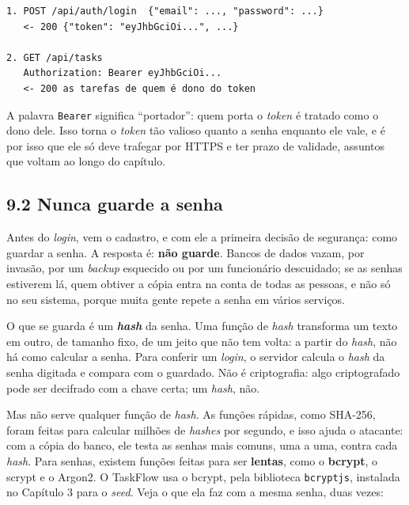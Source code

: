 \begin{codigo}
\begin{Verbatim}[breaklines=true, breaksymbolleft={}, fontsize=\footnotesize]
1. POST /api/auth/login  {"email": ..., "password": ...}
   <- 200 {"token": "eyJhbGciOi...", ...}

2. GET /api/tasks
   Authorization: Bearer eyJhbGciOi...
   <- 200 as tarefas de quem é dono do token
\end{Verbatim}
\end{codigo}

A palavra \texttt{Bearer} significa ``portador'': quem porta o \textit{token} é tratado como o dono dele. Isso torna o \textit{token} tão valioso quanto a senha enquanto ele vale, e é por isso que ele só deve trafegar por HTTPS e ter prazo de validade, assuntos que voltam ao longo do capítulo.

\subsection{9.2 Nunca guarde a senha}

Antes do \textit{login}, vem o cadastro, e com ele a primeira decisão de segurança: como guardar a senha. A resposta é: \textbf{não guarde}. Bancos de dados vazam, por invasão, por um \textit{backup} esquecido ou por um funcionário descuidado; se as senhas estiverem lá, quem obtiver a cópia entra na conta de todas as pessoas, e não só no seu sistema, porque muita gente repete a senha em vários serviços.

O que se guarda é um \textbf{\textit{hash}} da senha. Uma função de \textit{hash} transforma um texto em outro, de tamanho fixo, de um jeito que não tem volta: a partir do \textit{hash}, não há como calcular a senha. Para conferir um \textit{login}, o servidor calcula o \textit{hash} da senha digitada e compara com o guardado. Não é criptografia: algo criptografado pode ser decifrado com a chave certa; um \textit{hash}, não.

Mas não serve qualquer função de \textit{hash}. As funções rápidas, como SHA-256, foram feitas para calcular milhões de \textit{hashes} por segundo, e isso ajuda o atacante: com a cópia do banco, ele testa as senhas mais comuns, uma a uma, contra cada \textit{hash}. Para senhas, existem funções feitas para ser \textbf{lentas}, como o \textbf{bcrypt}, o scrypt e o Argon2. O TaskFlow usa o bcrypt, pela biblioteca \texttt{bcryptjs}, instalada no Capítulo 3 para o \textit{seed}. Veja o que ela faz com a mesma senha, duas vezes:

